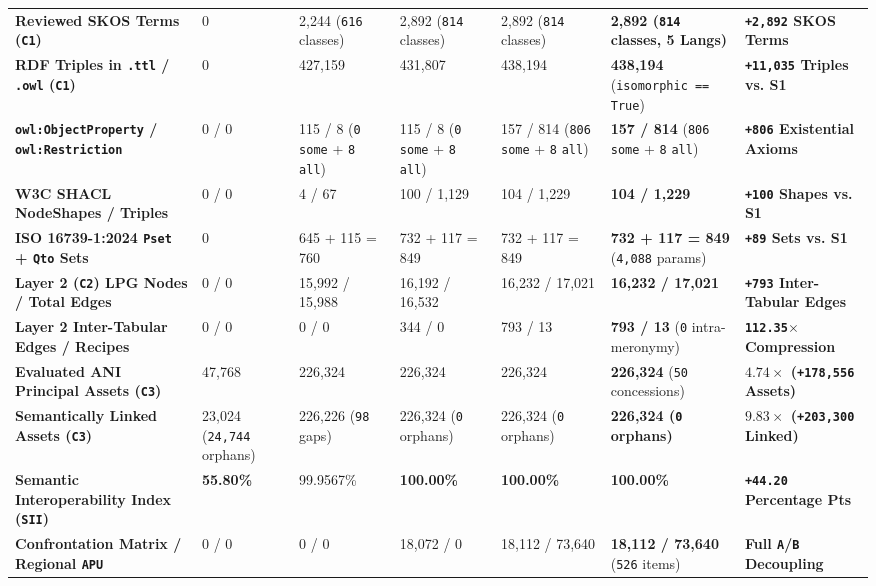 \documentclass[10pt,a4paper]{article}
\begin{document}
{\begin{longtable}{p{}p{}p{}p{}p{}p{}p{}}
\textbf{Reviewed SKOS Terms (\texttt{C1})} & 0 & 2,244 (\texttt{616} classes) & 2,892 (\texttt{814} classes) & 2,892 (\texttt{814} classes) & \textbf{2,892 (\texttt{814} classes, 5 Langs)} & \textbf{\texttt{+2,892} SKOS Terms} \\
\textbf{RDF Triples in \texttt{.ttl} / \texttt{.owl} (\texttt{C1})} & 0 & 427,159 & 431,807 & 438,194 & \textbf{438,194} (\texttt{isomorphic == True}) & \textbf{\texttt{+11,035} Triples vs. S1} \\
\textbf{\texttt{owl:ObjectProperty} / \texttt{owl:Restriction}} & 0 / 0 & 115 / 8 (\texttt{0} \texttt{some} + \texttt{8} \texttt{all}) & 115 / 8 (\texttt{0} \texttt{some} + \texttt{8} \texttt{all}) & 157 / 814 (\texttt{806} \texttt{some} + \texttt{8} \texttt{all}) & \textbf{157 / 814} (\texttt{806} \texttt{some} + \texttt{8} \texttt{all}) & \textbf{\texttt{+806} Existential Axioms} \\
\textbf{W3C SHACL NodeShapes / Triples} & 0 / 0 & 4 / 67 & 100 / 1,129 & 104 / 1,229 & \textbf{104 / 1,229} & \textbf{\texttt{+100} Shapes vs. S1} \\
\textbf{ISO 16739-1:2024 \texttt{Pset} + \texttt{Qto} Sets} & 0 & 645 + 115 = 760 & 732 + 117 = 849 & 732 + 117 = 849 & \textbf{732 + 117 = 849} (\texttt{4,088} params) & \textbf{\texttt{+89} Sets vs. S1} \\
\textbf{Layer 2 (\texttt{C2}) LPG Nodes / Total Edges} & 0 / 0 & 15,992 / 15,988 & 16,192 / 16,532 & 16,232 / 17,021 & \textbf{16,232 / 17,021} & \textbf{\texttt{+793} Inter-Tabular Edges} \\
\textbf{Layer 2 Inter-Tabular Edges / Recipes} & 0 / 0 & 0 / 0 & 344 / 0 & 793 / 13 & \textbf{793 / 13} (\texttt{0} intra-meronymy) & \textbf{\texttt{112.35$\times$} Compression} \\
\textbf{Evaluated ANI Principal Assets (\texttt{C3})} & 47,768 & 226,324 & 226,324 & 226,324 & \textbf{226,324} (\texttt{50} concessions) & \textbf{$4.74\times$ (\texttt{+178,556} Assets)} \\
\textbf{Semantically Linked Assets (\texttt{C3})} & 23,024 (\texttt{24,744} orphans) & 226,226 (\texttt{98} gaps) & 226,324 (\texttt{0} orphans) & 226,324 (\texttt{0} orphans) & \textbf{226,324 (\texttt{0} orphans)} & \textbf{$9.83\times$ (\texttt{+203,300} Linked)} \\
\textbf{Semantic Interoperability Index (\texttt{SII})} & \textbf{55.80\%} & 99.9567\% & \textbf{100.00\%} & \textbf{100.00\%} & \textbf{100.00\%} & \textbf{\texttt{+44.20} Percentage Pts} \\
\textbf{Confrontation Matrix / Regional \texttt{APU}} & 0 / 0 & 0 / 0 & 18,072 / 0 & 18,112 / 73,640 & \textbf{18,112 / 73,640} (\texttt{526} items) & \textbf{Full \texttt{A}/\texttt{B} Decoupling} \\
\bottomrule
\end{longtable}
}
\end{document}
